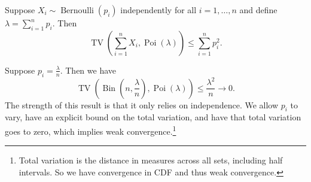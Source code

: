 \begin{theorem}
	Suppose $X_i \sim \operatorname{Bernoulli}(p_i)$ independently for all $i = 1,\ldots,n$ and define $\lambda = \sum_{i=1}^{n} p_i$. Then \[
		\operatorname{TV}\left( \sum\limits_{i=1}^{n} X_i, \operatorname{Poi}(\lambda) \right) \le \sum\limits_{i=1}^{n} p_i^2
	.\] 
\end{theorem}
\begin{example}
	Suppose $p_i = \frac{\lambda}{n}$. Then we have \[
		\operatorname{TV}\left( \operatorname{Bin}(n, \frac{\lambda}{n}), \operatorname{Poi}(\lambda) \right) \le \frac{\lambda^2}{n} \to 0
	.\] 
	The strength of this result is that it only relies on independence. We allow $p_i$ to vary, have an explicit bound on the total variation, and have that total variation goes to zero, which implies weak convergence.\footnote{Total variation is the distance in measures across all sets, including half intervals. So we have convergence in CDF and thus weak convergence.}
\end{example}
